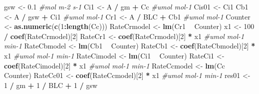 \documentclass[
]{krantz}
\makeatletter
\newenvironment{Shaded}{\begin{snugshade}}{\end{snugshade}}
\newcommand{\CommentTok}[1]{\textcolor[rgb]{0.56,0.35,0.01}{\textit{#1}}}
\newcommand{\DecValTok}[1]{\textcolor[rgb]{0.00,0.00,0.81}{#1}}
\newcommand{\FloatTok}[1]{\textcolor[rgb]{0.00,0.00,0.81}{#1}}
\newcommand{\KeywordTok}[1]{\textcolor[rgb]{0.13,0.29,0.53}{\textbf{#1}}}
\newcommand{\NormalTok}[1]{#1}
\newcommand{\OperatorTok}[1]{\textcolor[rgb]{0.81,0.36,0.00}{\textbf{#1}}}
\newcommand{\StringTok}[1]{\textcolor[rgb]{0.31,0.60,0.02}{#1}}
\newenvironment{kframe}{%
\medskip{}
\setlength{\fboxsep}{.8em}
 \def\at@end@of@kframe{}%
 \ifinner\ifhmode%
  \def\at@end@of@kframe{\end{minipage}}%
  \begin{minipage}{\columnwidth}%
 \fi\fi%
 \def\FrameCommand##1{\hskip\@totalleftmargin \hskip-\fboxsep
 \colorbox{shadecolor}{##1}\hskip-\fboxsep
     \hskip-\linewidth \hskip-\@totalleftmargin \hskip\columnwidth}%
 \MakeFramed {\advance\hsize-\width
   \@totalleftmargin\z@ \linewidth\hsize
   \@setminipage}}%
 {\par\unskip\endMakeFramed%
 \at@end@of@kframe}
\renewenvironment{Shaded}{\begin{kframe}}{\end{kframe}}
\makeatother
\begin{document}
\begin{Shaded}
\begin{Highlighting}[]
\NormalTok{gsw <-}\StringTok{ }\FloatTok{0.1} \CommentTok{#mol m-2 s-1}
\NormalTok{Ci1 <-}\StringTok{ }\NormalTok{A }\OperatorTok{/}\StringTok{ }\NormalTok{gm }\OperatorTok{+}\StringTok{ }\NormalTok{Cc }\CommentTok{#umol mol-1}
\NormalTok{Cis01 <-}\StringTok{ }\NormalTok{Ci1}
\NormalTok{Cb1 <-}\StringTok{ }\NormalTok{A }\OperatorTok{/}\StringTok{ }\NormalTok{gsw }\OperatorTok{+}\StringTok{ }\NormalTok{Ci1 }\CommentTok{#umol mol-1}
\NormalTok{Cr1 <-}\StringTok{ }\NormalTok{A }\OperatorTok{/}\StringTok{ }\NormalTok{BLC }\OperatorTok{+}\StringTok{ }\NormalTok{Cb1 }\CommentTok{#umol mol-1}
\NormalTok{Counter <-}\StringTok{ }\KeywordTok{as.numeric}\NormalTok{(}\KeywordTok{c}\NormalTok{(}\DecValTok{1}\OperatorTok{:}\KeywordTok{length}\NormalTok{(Cc)))}
\NormalTok{RateCrmodel <-}\StringTok{ }\KeywordTok{lm}\NormalTok{(Cr1 }\OperatorTok{~}\StringTok{ }\NormalTok{Counter)}
\NormalTok{x1 <-}\StringTok{ }\DecValTok{100} \OperatorTok{/}\StringTok{ }\KeywordTok{coef}\NormalTok{(RateCrmodel)[}\DecValTok{2}\NormalTok{]}
\NormalTok{RateCr1 <-}\StringTok{ }\KeywordTok{coef}\NormalTok{(RateCrmodel)[}\DecValTok{2}\NormalTok{] }\OperatorTok{*}\StringTok{ }\NormalTok{x1 }\CommentTok{#umol mol-1 min-1}
\NormalTok{RateCbmodel <-}\StringTok{ }\KeywordTok{lm}\NormalTok{(Cb1 }\OperatorTok{~}\StringTok{ }\NormalTok{Counter)}
\NormalTok{RateCb1 <-}\StringTok{ }\KeywordTok{coef}\NormalTok{(RateCbmodel)[}\DecValTok{2}\NormalTok{] }\OperatorTok{*}\StringTok{ }\NormalTok{x1 }\CommentTok{#umol mol-1 min-1}
\NormalTok{RateCimodel <-}\StringTok{ }\KeywordTok{lm}\NormalTok{(Ci1 }\OperatorTok{~}\StringTok{ }\NormalTok{Counter)}
\NormalTok{RateCi1 <-}\StringTok{ }\KeywordTok{coef}\NormalTok{(RateCimodel)[}\DecValTok{2}\NormalTok{] }\OperatorTok{*}\StringTok{ }\NormalTok{x1 }\CommentTok{#umol mol-1 min-1}
\NormalTok{RateCcmodel <-}\StringTok{ }\KeywordTok{lm}\NormalTok{(Cc }\OperatorTok{~}\StringTok{ }\NormalTok{Counter)}
\NormalTok{RateCc01 <-}\StringTok{ }\KeywordTok{coef}\NormalTok{(RateCcmodel)[}\DecValTok{2}\NormalTok{] }\OperatorTok{*}\StringTok{ }\NormalTok{x1 }\CommentTok{#umol mol-1 min-1}
\NormalTok{res01 <-}\StringTok{ }\DecValTok{1} \OperatorTok{/}\StringTok{ }\NormalTok{gm }\OperatorTok{+}\StringTok{ }\DecValTok{1} \OperatorTok{/}\StringTok{ }\NormalTok{BLC }\OperatorTok{+}\StringTok{ }\DecValTok{1} \OperatorTok{/}\StringTok{ }\NormalTok{gsw}


\end{Highlighting}
\end{Shaded}
\end{document}
